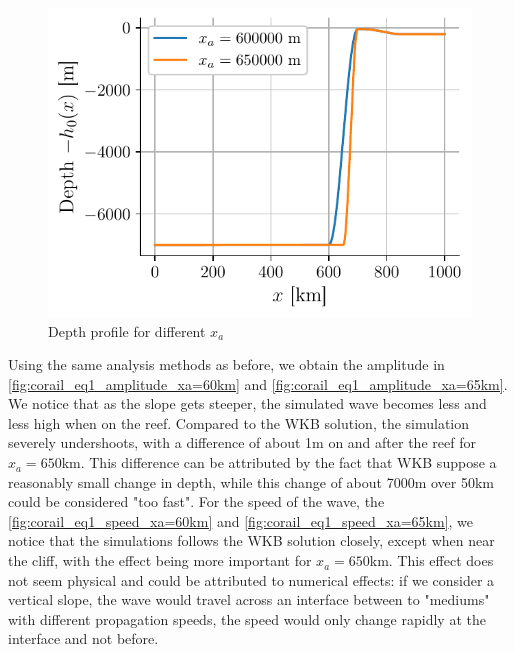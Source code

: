 \begin{figure}
    \vspace*{-0.8cm}
    \centering
    \includegraphics[width=\linewidth]{figures/corail_eq1_depth_var_xa.pdf}
    \caption{Depth profile for different \(x_a\)}
    \label{fig:corail_eq1_depth_xa}
    \vspace*{-0.4cm}
\end{figure}
Using the same analysis methods as before, we obtain the amplitude in \autoref{fig:corail_eq1_amplitude_xa=60km} and \autoref{fig:corail_eq1_amplitude_xa=65km}. We notice that as the slope gets steeper, the simulated wave becomes less and less high when on the reef. Compared to the WKB solution, the simulation severely undershoots, with a difference of about 1m on and after the reef for \(x_a = 650\)km. This difference can be attributed by the fact that WKB suppose a reasonably small change in depth, while this change of about 7000m over 50km could be considered "too fast". For the speed of the wave, the \autoref{fig:corail_eq1_speed_xa=60km} and \autoref{fig:corail_eq1_speed_xa=65km}, we notice that the simulations follows the WKB solution closely, except when near the cliff, with the effect being more important for \(x_a = 650\)km. This effect does not seem physical and could be attributed to numerical effects: if we consider a vertical slope, the wave would travel across an interface between to "mediums" with different propagation speeds, the speed would only change rapidly at the interface and not before.

